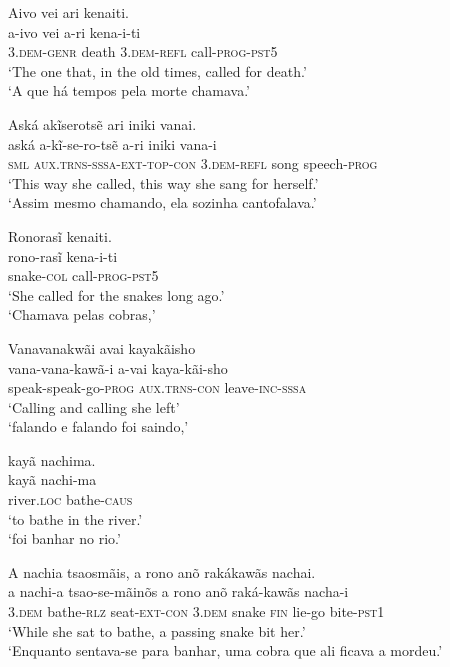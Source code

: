 \documentclass[output=paper,
modfonts,nonflat
]{langsci/langscibook}
\begin{document}
\ea Aivo vei ari kenaiti. \\[.3em]
\gll a-ivo               vei   a-ri                kena-i-ti               \\
     3.\textsc{dem-genr} death 3.\textsc{dem-refl} call-\textsc{prog-pst5} \\
\glt `The one that, in the old times, called for death.' \\
`A que há tempos pela morte chamava.' \\
\z

\ea Aská akĩserotsẽ ari iniki vanai. \\[.3em]
\gll aská         a-kĩ-se-ro-tsẽ                     a-ri                iniki vana-i               \\
     \textsc{sml} \textsc{aux.trns-sssa-ext-top-con} 3\textsc{.dem-refl} song  speech-\textsc{prog} \\
\glt `This way she called, this way she sang for herself.' \\
`Assim mesmo chamando, ela sozinha cantofalava.'  \\
\z

\ea Ronorasĩ kenaiti. \\[.3em]
\gll rono-rasĩ          kena-i-ti               \\
     snake-\textsc{col} call-\textsc{prog-pst5} \\
\glt `She called for the snakes long ago.' \\
`Chamava pelas cobras,' \\
\z

  
\ea Vanavanakwãi avai kayakãisho \\[.3em]
\gll vana-vana-kawã-i             a-vai                 kaya-kãi-sho            \\
     speak-speak-go-\textsc{prog} \textsc{aux.trns-con} leave-\textsc{inc-sssa} \\
\glt `Calling and calling she left' \\
`falando e falando foi saindo,'\\
\z

\newpage 
\ea kayã nachima. \\[.3em]
\gll kayã               nachi-ma            \\
     river.\textsc{loc} bathe-\textsc{caus} \\
\glt `to bathe in the river.' \\
`foi banhar no rio.'\\
\z

\ea A nachia tsaosmãis, a rono anõ rakákawãs nachai. \\[.3em]
\gll a              nachi-a            tsao-se-mãinõs       a              rono  anõ          raká-kawãs nacha-i            \\
     3.\textsc{dem} bathe-\textsc{rlz} seat-\textsc{ext-con} 3.\textsc{dem} snake \textsc{fin} lie-go     bite-\textsc{pst1} \\
\glt `While she sat to bathe, a passing snake bit her.' \\
`Enquanto sentava-se para banhar, uma cobra que ali ficava a mordeu.' \\
\z
\end{document}
